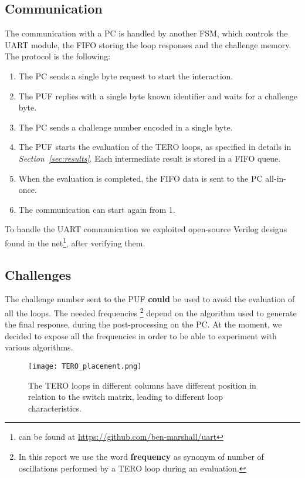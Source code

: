 \subsection{Communication}
The communication with a PC is handled by another FSM, which controls the UART module, 
the FIFO storing the loop responses and the challenge memory. \\
The protocol is the following:
\begin{enumerate}
    \item The PC sends a single byte request to start the interaction.
    \item The PUF replies with a single byte known identifier and waits for a challenge byte.
    \item The PC sends a challenge number encoded in a single byte.
    \item The PUF starts the evaluation of the TERO loops, as specified in details in \textit{Section~\ref{sec:results}}. 
          Each intermediate result is stored in a FIFO queue.
    \item When the evaluation is completed, the FIFO data is sent to the PC all-in-once.
    \item The communication can start again from 1.
\end{enumerate}
To handle the UART communication we exploited open-source Verilog designs found in the
net\footnote{can be found at \href{https://github.com/ben-marshall/uart}{\color{bluePoli}https://github.com/ben-marshall/uart}}, after verifying them.

\subsection{Challenges}
The challenge number sent to the PUF \textbf{could} be used to avoid the evaluation of all the loops.
The needed frequencies
\footnote{In this report we use the word \textbf{frequency} as synonym of number of oscillations performed by a TERO loop during an evaluation.}
depend on the algorithm used to generate the final response, during the post-processing on the PC. 
At the moment, we decided to expose all the frequencies in order to be able to experiment 
with various algorithms. 

\begin{figure}[H]
    \centering
    \texttt{[image: TERO\_placement.png]}
    \caption{The TERO loops in different columns have different position in relation to the switch matrix, leading to different loop characteristics.}
    \label{img:TERO_PLACEMENT}
\end{figure}